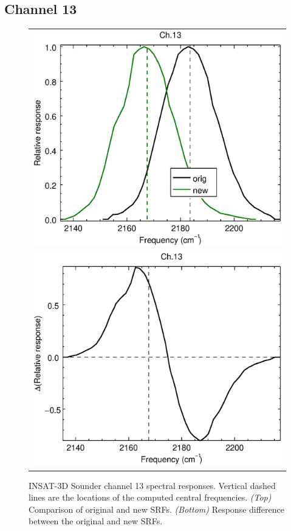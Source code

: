 \subsection{Channel 13}
\begin{figure}[H]
  \centering
  \begin{tabular}{c}
    \includegraphics[scale=0.55]{graphics/sndr/srf/sndr_insat3d-13.eps} \\
    \includegraphics[scale=0.55]{graphics/sndr/srf/sndr_insat3d-13.difference.eps}
  \end{tabular}
  \caption{INSAT-3D Sounder channel 13 spectral responses. Vertical dashed lines are the locations of the computed central frequencies. \emph{(Top)} Comparison of original and new SRFs. \emph{(Bottom)} Response difference between the original and new SRFs.}
  \label{fig:sndr_ch13}
\end{figure}

